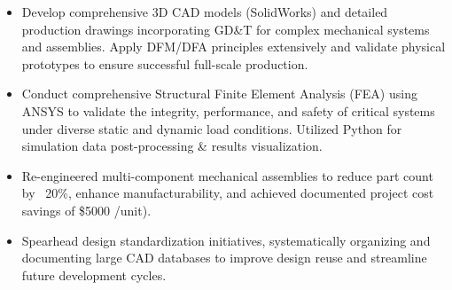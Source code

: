 \documentclass[11pt, letterpaper]{article}
\begin{document}
\begin{itemize}[leftmargin=*, label=\textbullet]
\setlength\itemsep{-2pt}
\vspace{-8pt}
\item Develop comprehensive 3D CAD models (SolidWorks) and detailed production drawings incorporating GD\&T for complex mechanical systems and assemblies. Apply DFM/DFA principles extensively and validate physical prototypes to ensure successful full-scale production.
\item Conduct comprehensive Structural Finite Element Analysis (FEA) using ANSYS to validate the integrity, performance, and safety of critical systems under diverse static and dynamic load conditions. Utilized Python for simulation data post-processing \& results visualization.
\item Re-engineered multi-component mechanical assemblies to reduce part count by ~20\%, enhance manufacturability, and achieved documented project cost savings of \$5000 /unit).
\item Spearhead design standardization initiatives, systematically organizing and documenting large CAD databases to improve design reuse and streamline future development cycles.
\end{itemize}\vspace{-8pt}
\end{document}
